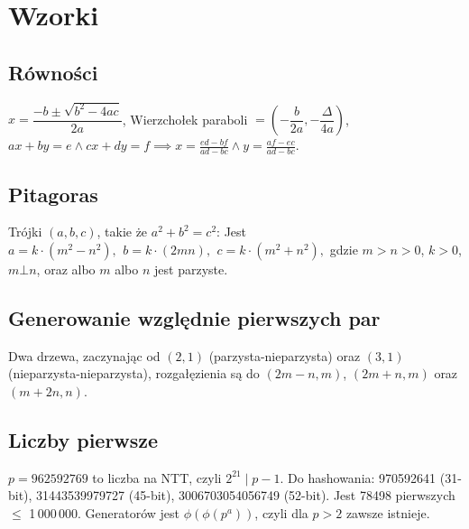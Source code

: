 \chapter{Wzorki}

\section{Równości}
$x = \dfrac{-b\pm\sqrt{b^2-4ac}}{2a}$,
Wierzchołek paraboli $= (- \dfrac{b}{2a}, - \dfrac{\Delta}{4a})$,
$ax+by=e \wedge cx+dy=f \implies
x=\frac{ed-bf}{ad-bc} \wedge y=\frac{af-ec}{ad-bc}$.

\section{Pitagoras}
Trójki $(a, b, c)$, takie że $a^2+b^2=c^2$:
 Jest $a=k\cdot (m^{2}-n^{2}),\ \,b=k\cdot (2mn),\ \,c=k\cdot (m^{2}+n^{2}),$
 gdzie $m > n > 0$, $k > 0$, $m \bot n$, oraz albo $m$ albo $n$ jest parzyste.

\section{Generowanie względnie pierwszych par}
Dwa drzewa, zaczynając od $(2, 1)$ (parzysta-nieparzysta) oraz $(3, 1)$ (nieparzysta-nieparzysta), rozgałęzienia są do $(2m-n,m)$, $(2m+n,m)$ oraz $(m+2n,n)$.

\section{Liczby pierwsze}
	$p=962592769$ to liczba na NTT, czyli $2^{21} \mid p-1$. Do hashowania:
	970592641 (31-bit), 31443539979727 (45-bit), 3006703054056749 (52-bit). 
	Jest 78498 pierwszych $\leq$ 1\,000\,000.
	Generatorów jest $\phi(\phi(p^a))$, czyli dla $p>2$ zawsze istnieje.

